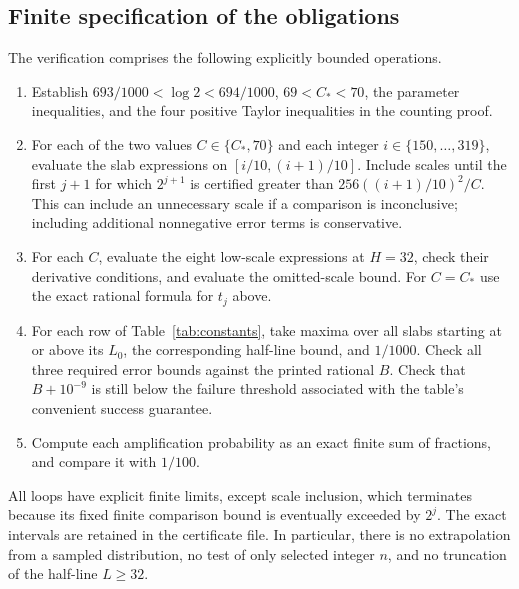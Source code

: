 \subsection{Finite specification of the obligations}
The verification comprises the following explicitly bounded operations.
\begin{enumerate}
\item Establish $693/1000<\log2<694/1000$, $69<C_*<70$, the parameter
inequalities, and the four positive Taylor inequalities in the counting proof.
\item For each of the two values $C\in\{C_*,70\}$ and each integer
$i\in\{150,\ldots,319\}$, evaluate the slab expressions on
$[i/10,(i+1)/10]$. Include scales until the first $j+1$ for which
$2^{j+1}$ is certified greater than $256((i+1)/10)^2/C$.
This can include an unnecessary scale if a comparison is inconclusive;
including additional nonnegative error terms is conservative.
\item For each $C$, evaluate the eight low-scale expressions at $H=32$,
check their derivative conditions, and evaluate the omitted-scale bound.
For $C=C_*$ use the exact rational formula for $t_j$ above.
\item For each row of Table~\ref{tab:constants}, take maxima over all slabs
starting at or above its $L_0$, the corresponding half-line bound, and
$1/1000$. Check all three required error bounds against the printed rational
$B$. Check that $B+10^{-9}$ is still below the failure threshold associated
with the table's convenient success guarantee.
\item Compute each amplification probability as an exact finite sum of
fractions, and compare it with $1/100$.
\end{enumerate}
All loops have explicit finite limits, except scale inclusion, which terminates
because its fixed finite comparison bound is eventually exceeded by $2^j$.
The exact intervals are retained in the certificate file. In particular,
there is no extrapolation from a sampled distribution, no test of only
selected integer $n$, and no truncation of the half-line $L\ge32$.

